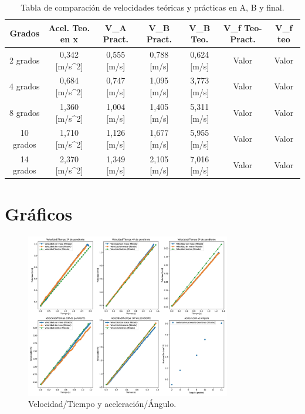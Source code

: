 \documentclass[twocolumn,12pt]{article}
\begin{document}
        \begin{table}[h!]
		\centering

		\begin{tabular}{|c|c|c|c|c|c|c|}
			\hline
			\rowcolor{white} %
			Grados & Acel. Teo. en x & V_{A} Pract.  & V_{B} Pract. & V_{B} Teo. & V_{f} Teo-Pract. & V_{f} teo \\ \hline
			2 grados & 0,342 [m/s^{2}] & 0,555 [m/s] & 0,788 [m/s] & 0,624 [m/s] & Valor & Valor \\ \hline
			4 grados & 0,684 [m/s^{2}] & 0,747 [m/s] & 1,095 [m/s] & 3,773 [m/s]& Valor & Valor \\ \hline
			8 grados & 1,360 [m/s^{2}] & 1,004 [m/s] & 1,405 [m/s] & 5,311 [m/s]& Valor & Valor \\ \hline
			10 grados & 1,710 [m/s^{2}] & 1,126 [m/s] & 1,677 [m/s] & 5,955 [m/s] & Valor & Valor \\ \hline
			14 grados & 2,370 [m/s^{2}] & 1,349 [m/s] & 2,105 [m/s] & 7,016 [m/s] & Valor & Valor \\ \hline
		\end{tabular}
		\caption{Tabla de comparación de velocidades teóricas y prácticas en A, B y final.}
		\label{tabla:caida_galileo}
	\end{table}

    \onecolumn
    \section{Gráficos}
    
    
    \begin{figure}[h]
        \centering
        \includegraphics[width=0.8\textwidth]{Lab1/Multimedia/grafico1.jpg}
        \caption{Velocidad/Tiempo y aceleración/Ángulo.}
        \label{fig:imagen}
    \end{figure}
\end{document}
